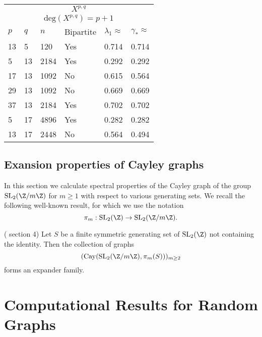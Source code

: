 \begin{center}
	\begin{tabular}{ p{1.5cm}|p{1.5cm}|p{1.5cm}|p{1.5cm}|p{1.5cm}|p{1.5cm}  }
		\multicolumn{6}{c}{$X^{p,q}$} \\
		\multicolumn{6}{c}{$\mathrm{deg}(X^{p,q}) = p + 1$} \\
		\hline
		$p$ & $q$ & $n$ & Bipartite & $\lambda_1 \approx$  & $\gamma_{*} \approx$   \\
		\hline
		13 & 5 & 120 & Yes & 0.714 &   0.714  \\
		5 & 13 & 2184 & Yes & 0.292 &  0.292  \\
		17 & 13 & 1092 & No & 0.615 & 0.564 \\
		29 & 13 & 1092 & No & 0.669 & 0.669 \\
		37 & 13 & 2184 & Yes & 0.702 &  0.702  \\
		5 & 17 & 4896 & Yes & 0.282 &  0.282  \\
		13 & 17 & 2448 & No & 0.564 &  0.494  \\
	\end{tabular}
\end{center}


\subsection{Exansion properties of Cayley graphs}

In this section we calculate spectral properties of the Cayley graph of the group $\mathrm{SL}_2(\Z/m\Z)$ for $m\geq 1$ with respect to various generating sets. We recall the following well-known result, for which we use the notation $$\pi_m : \mathrm{SL}_2(\Z) \to \mathrm{SL}_2(\Z/m\Z).$$

\begin{theorem}(\cite{LubotzkyDiscreteBook} section 4) 
	Let $S$ be a finite symmetric generating set of $\mathrm{SL}_2(\Z)$ not containing the identity. Then the collection of graphs $$(\mathrm{Cay}(\mathrm{SL}_2(\Z/m\Z), \pi_m(S)))_{m \geq 2}$$ forms an expander family. 
\end{theorem}




\newpage

\section{Computational Results for Random Graphs}

